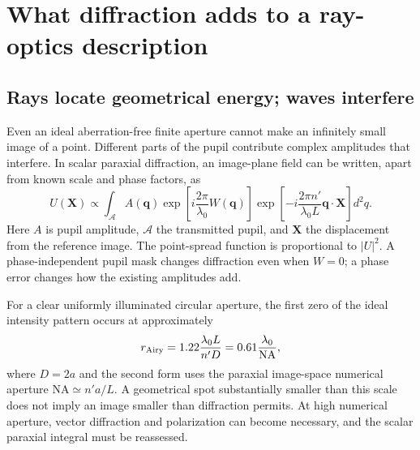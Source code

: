 \chapter{What diffraction adds to a ray-optics description}
\label{ab:diffraction}

\section{Rays locate geometrical energy; waves interfere}
Even an ideal aberration-free finite aperture cannot make an infinitely small
image of a point. Different parts of the pupil contribute complex amplitudes
that interfere. In scalar paraxial diffraction, an image-plane field can be
written, apart from known scale and phase factors, as
\begin{equation}
 U(\bm X)\propto\int_{\mathcal A}A(\bm q)
       \exp\left[i\frac{2\pi}{\lambda_0}W(\bm q)\right]
       \exp\left[-i\frac{2\pi n'}{\lambda_0L}
                         \bm q\cdot\bm X\right]d^2q.
 \label{ab:PSF}
\end{equation}
Here $A$ is pupil amplitude, $\mathcal A$ the transmitted pupil, and
$\bm X$ the displacement from the reference image. The point-spread function
is proportional to $|U|^2$. A phase-independent pupil mask changes diffraction
even when $W=0$; a phase error changes how the existing amplitudes add.

For a clear uniformly illuminated circular aperture, the first zero of the
ideal intensity pattern occurs at approximately
\begin{equation}
 r_{\rm Airy}=1.22\frac{\lambda_0L}{n'D}
             =0.61\frac{\lambda_0}{\mathrm{NA}},
\end{equation}
where $D=2a$ and the second form uses the paraxial image-space numerical
aperture $\mathrm{NA}\simeq n'a/L$. A geometrical spot substantially smaller
than this scale does not imply an image smaller than diffraction permits.
At high numerical aperture, vector diffraction and polarization can become
necessary, and the scalar paraxial integral must be reassessed.

